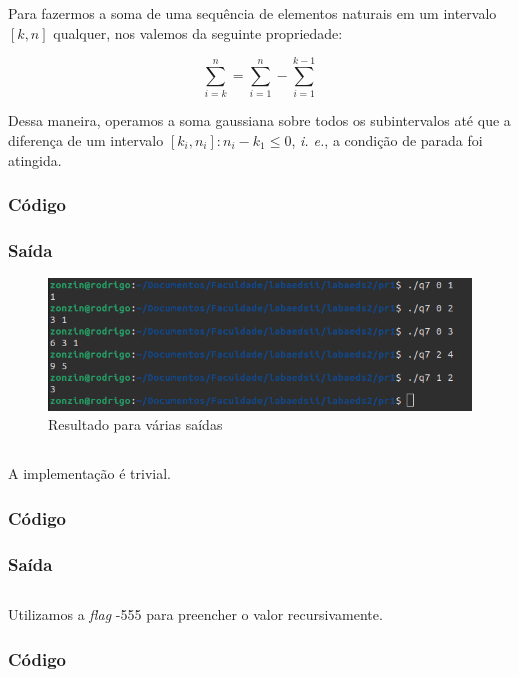 Para fazermos a soma de uma sequência de elementos naturais em um intervalo $[k, n]$ qualquer, nos valemos da seguinte propriedade: 

$$ \sum_{i =k }^{n} = \sum_{i=1}^{n} - \sum_{i=1}^{k-1}$$


Dessa maneira, operamos a soma gaussiana sobre todos os subintervalos até que a diferença de um intervalo $[k_i, n_i] : n_i - k_1 \leq 0$, \textit{i. e.}, a condição de parada foi atingida. 

\subsubsection*{Código}

\subsubsection*{Saída}
\begin{figure}[h!]
	\centering
	\includegraphics[width=0.7\linewidth]{imagens/saida_q7}
	\caption{Resultado para várias saídas}
	\label{fig:saidaq7}
\end{figure}

\newpage
\subsection{}
A implementação é trivial.
\subsubsection*{Código}

\subsubsection*{Saída}

\subsection{}
Utilizamos a \textit{flag} -555 para preencher o valor recursivamente. 
\subsubsection*{Código}
\begin{multicols}{2}
	
\end{multicols}

